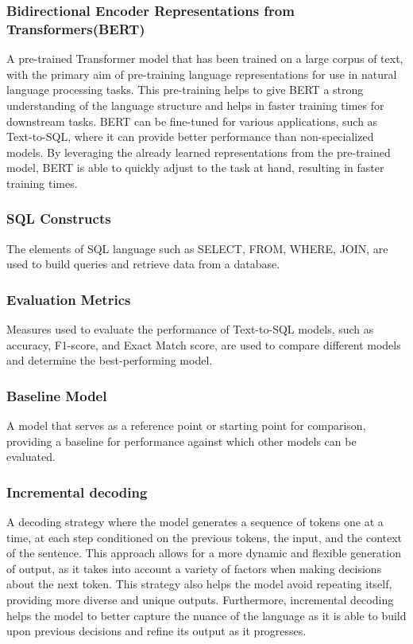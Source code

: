 \subsubsection{Bidirectional Encoder Representations from Transformers(BERT)}

A pre-trained Transformer model that has been trained on a large corpus of text, with the primary aim of pre-training language representations for use in natural language processing tasks\cite{devlin-etal-2019-bert}. This pre-training helps to give BERT a strong understanding of the language structure and helps in faster training times for downstream tasks. BERT can be fine-tuned for various applications, such as Text-to-SQL, where it can provide better performance than non-specialized models. By leveraging the already learned representations from the pre-trained model, BERT is able to quickly adjust to the task at hand, resulting in faster training times.

\subsubsection{SQL Constructs}

The elements of SQL language such as SELECT, FROM, WHERE, JOIN, are used to build queries and retrieve data from a database.

\subsubsection{Evaluation Metrics}

Measures used to evaluate the performance of Text-to-SQL models, such as accuracy, F1-score, and Exact Match score, are used to compare different models and determine the best-performing model.

\subsubsection{Baseline Model}

A model that serves as a reference point or starting point for comparison, providing a baseline for performance against which other models can be evaluated.

\subsubsection{Incremental decoding}

A decoding strategy where the model generates a sequence of tokens one at a time, at each step conditioned on the previous tokens, the input, and the context of the sentence. This approach allows for a more dynamic and flexible generation of output, as it takes into account a variety of factors when making decisions about the next token. This strategy also helps the model avoid repeating itself, providing more diverse and unique outputs. Furthermore, incremental decoding helps the model to better capture the nuance of the language as it is able to build upon previous decisions and refine its output as it progresses\cite{huang-mi-2010-efficient}.


